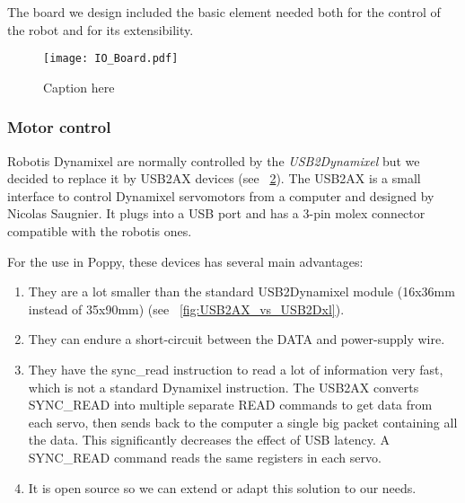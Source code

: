 The board we design included the basic element needed both for the control of the robot and for its extensibility.


\begin{figure}[tb]
    \begin{center}
        \texttt{[image: IO\_Board.pdf]}
    \end{center}
    \caption{Caption here}
    \label{fig:figure1}
\end{figure}


\subsubsection{Motor control} %
Robotis Dynamixel are normally controlled by the \emph{USB2Dynamixel} but we decided to replace it by USB2AX devices (see \figurename~\ref{fig:usb2ax}). The USB2AX is a small interface to control Dynamixel servomotors from a computer and designed by Nicolas Saugnier. It plugs into a USB port and has a 3-pin molex connector compatible with the robotis ones.

For the use in Poppy, these devices has several main advantages:
\begin{enumerate}
    \item They are a lot smaller than the standard USB2Dynamixel module (16x36mm instead of 35x90mm) (see \figurename~\ref{fig:USB2AX_vs_USB2Dxl}).
    \item They can endure a short-circuit between the DATA and power-supply wire.
    \item They have the sync\_read instruction to read a lot of information very fast, which is not a standard Dynamixel instruction. The USB2AX converts SYNC\_READ into multiple separate READ commands to get data from each servo, then sends back to the computer a single big packet containing all the data. This significantly decreases the effect of USB latency. A SYNC\_READ command reads the same registers in each servo.
    \item It is open source so we can extend or adapt this solution to our needs.
\end{enumerate}

\begin{figure}[tb]
\centering
    \hfil
    \\
    \caption{}
    \label{fig:usb2ax}
\end{figure}

